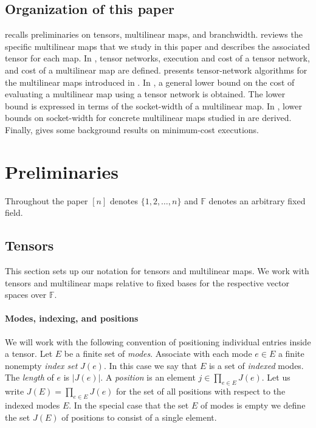 \documentclass{toc}
\newcommand{\F}{\ensuremath{\mathbb{F}}}
\begin{document}
\subsection{Organization of this paper}

 recalls preliminaries on tensors, multilinear maps, and branchwidth.  reviews the specific multilinear maps that we study in this %
paper  %
and describes
the associated tensor for each map. In , tensor networks, execution and cost of a tensor network, and cost of a multilinear map are defined.  presents tensor-network algorithms for the multilinear maps introduced in . In , a general lower bound on the cost of evaluating a multilinear map using
a  %
%
tensor network is obtained. The lower bound is expressed in terms of the socket-width of a multilinear map. In , lower bounds on socket-width for concrete multilinear maps studied in   are derived. Finally,  gives some background results on minimum-cost executions.

\section{Preliminaries}
\label{sect:preliminaries}

Throughout the paper $[n]$ denotes $\{1,2,\ldots,n\}$ and $\F$ denotes
an arbitrary fixed field.

\subsection{Tensors}
\label{sect:tensors-maps}

This section sets up our notation for tensors and multilinear maps.
We work with tensors and multilinear maps relative to fixed bases for
the respective vector spaces over $\F$.

\paragraph*{Modes, indexing, and positions}

We will work with the following convention of positioning individual
entries inside a tensor.  Let $E$ be a finite set of 
\emph{modes}. Associate with each mode $e\in E$ a finite nonempty
\emph{index set} $J(e)$. In this case we say that $E$ is a set of
\emph{indexed} modes.  The \emph{length} of $e$ is $|J(e)|$. 
A \emph{position} is an element $j\in \prod_{e\in E}J(e)$. 
Let us write $J(E)=\prod_{e\in E}J(e)$ for the set of all
positions with respect to the indexed modes $E$.  In the special case
that the %
set $E$ of modes  %
is empty we define the
%
set $J(E)$ of positions  %
to consist of a single element.
\end{document}

